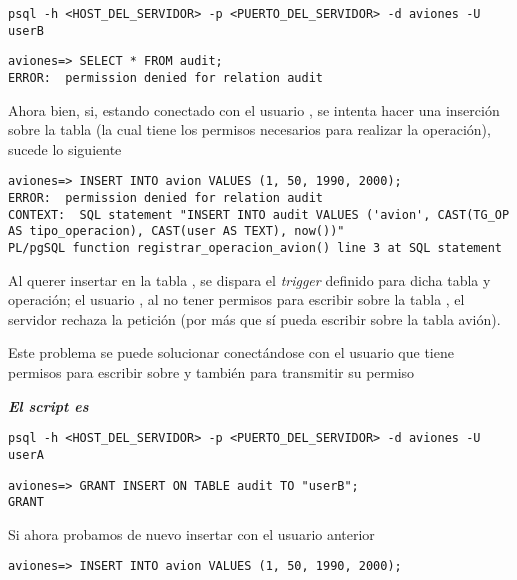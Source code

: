 \vspace*{5mm}
\lstset{style=bash}
\begin{lstlisting}
psql -h <HOST_DEL_SERVIDOR> -p <PUERTO_DEL_SERVIDOR> -d aviones -U userB
\end{lstlisting}

\lstset{style=sql}
\begin{lstlisting}
aviones=> SELECT * FROM audit;
ERROR:  permission denied for relation audit
\end{lstlisting}

Ahora bien, si, estando conectado con el usuario , se intenta hacer una inserción sobre la tabla  (la cual tiene los permisos necesarios para realizar la operación), sucede lo siguiente

\lstset{style=sql}
\begin{lstlisting}
aviones=> INSERT INTO avion VALUES (1, 50, 1990, 2000);
ERROR:  permission denied for relation audit
CONTEXT:  SQL statement "INSERT INTO audit VALUES ('avion', CAST(TG_OP AS tipo_operacion), CAST(user AS TEXT), now())"
PL/pgSQL function registrar_operacion_avion() line 3 at SQL statement
\end{lstlisting}

Al querer insertar en la tabla , se dispara el \emph{trigger} definido para dicha tabla y operación; el usuario , al no tener permisos para escribir sobre la tabla , el servidor rechaza la petición (por más que sí pueda escribir sobre la tabla avión).

Este problema se puede solucionar conectándose con el usuario  que tiene permisos para escribir sobre  y también para transmitir su permiso

\emph{\textbf{El script es }} 

\vspace*{5mm}
\lstset{style=bash}
\begin{lstlisting}
psql -h <HOST_DEL_SERVIDOR> -p <PUERTO_DEL_SERVIDOR> -d aviones -U userA
\end{lstlisting}

\lstset{style=bash}
\begin{lstlisting}
aviones=> GRANT INSERT ON TABLE audit TO "userB";
GRANT
\end{lstlisting}

Si ahora probamos de nuevo insertar con el usuario anterior

\vspace*{5mm}
\lstset{style=sql}
\begin{lstlisting}
aviones=> INSERT INTO avion VALUES (1, 50, 1990, 2000);
\end{lstlisting}


